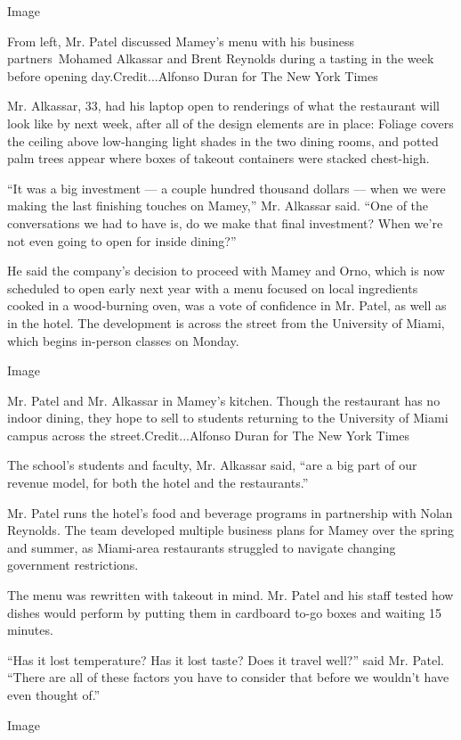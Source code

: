 Image

From left, Mr. Patel discussed Mamey's menu with his business
partners~Mohamed Alkassar and Brent Reynolds during a tasting in the
week before opening day.Credit...Alfonso Duran for The New York Times

Mr. Alkassar, 33, had his laptop open to renderings of what the
restaurant will look like by next week, after all of the design elements
are in place: Foliage covers the ceiling above low-hanging light shades
in the two dining rooms, and potted palm trees appear where boxes of
takeout containers were stacked chest-high.

``It was a big investment --- a couple hundred thousand dollars --- when
we were making the last finishing touches on Mamey,'' Mr. Alkassar said.
``One of the conversations we had to have is, do we make that final
investment? When we're not even going to open for inside dining?''

He said the company's decision to proceed with Mamey and Orno, which is
now scheduled to open early next year with a menu focused on local
ingredients cooked in a wood-burning oven, was a vote of confidence in
Mr. Patel, as well as in the hotel. The development is across the street
from the University of Miami, which begins in-person classes on Monday.

Image

Mr. Patel and Mr. Alkassar in Mamey's kitchen. Though the restaurant has
no indoor dining, they hope to sell to students returning to the
University of Miami campus across the street.Credit...Alfonso Duran for
The New York Times

The school's students and faculty, Mr. Alkassar said, ``are a big part
of our revenue model, for both the hotel and the restaurants.''

Mr. Patel runs the hotel's food and beverage programs in partnership
with Nolan Reynolds. The team developed multiple business plans for
Mamey over the spring and summer, as Miami-area restaurants struggled to
navigate changing government restrictions.

The menu was rewritten with takeout in mind. Mr. Patel and his staff
tested how dishes would perform by putting them in cardboard to-go boxes
and waiting 15 minutes.

``Has it lost temperature? Has it lost taste? Does it travel well?''
said Mr. Patel. ``There are all of these factors you have to consider
that before we wouldn't have even thought of.''

Image

